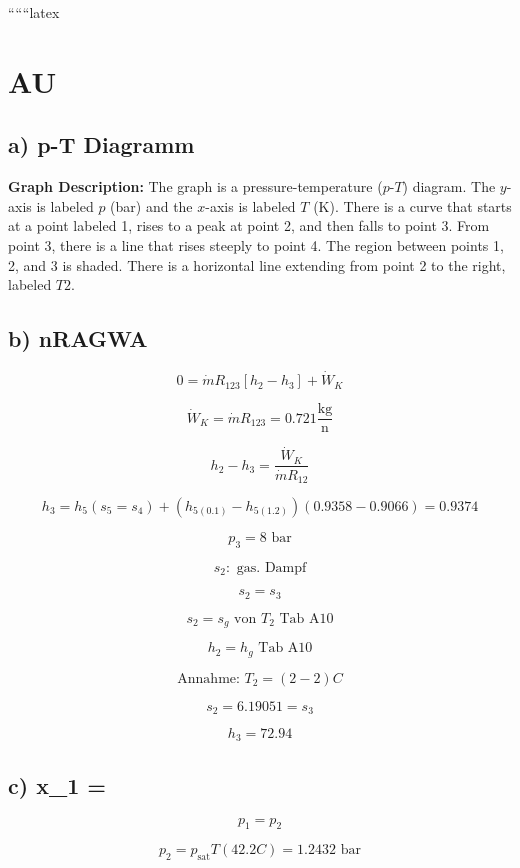 
``````latex


\section*{AU}

\subsection*{a) p-T Diagramm}

\textbf{Graph Description:} The graph is a pressure-temperature ($p$-$T$) diagram. The $y$-axis is labeled $p$ (bar) and the $x$-axis is labeled $T$ (K). There is a curve that starts at a point labeled 1, rises to a peak at point 2, and then falls to point 3. From point 3, there is a line that rises steeply to point 4. The region between points 1, 2, and 3 is shaded. There is a horizontal line extending from point 2 to the right, labeled $T2$.

\subsection*{b) nRAGWA}

\[
0 = \dot{m} R_{123} \left[ h_2 - h_3 \right] + \dot{W}_K
\]

\[
\dot{W}_K = \dot{m} R_{123} = 0.721 \frac{\text{kg}}{\text{n}}
\]

\[
h_2 - h_3 = \frac{\dot{W}_K}{\dot{m} R_{12}}
\]

\[
h_3 = h_5 (s_5 = s_4) + \left( h_{5(0.1)} - h_{5(1.2)} \right) \left( 0.9358 - 0.9066 \right) = 0.9374
\]

\[
p_3 = 8 \text{ bar}
\]

\[
s_2: \text{ gas. Dampf}
\]

\[
s_2 = s_3
\]

\[
s_2 = s_g \text{ von } T_2 \text{ Tab A10}
\]

\[
h_2 = h_g \text{ Tab A10}
\]

\[
\text{Annahme: } T_2 = (2-2) C
\]

\[
s_2 = 6.19051 = s_3
\]

\[
h_3 = 72.94
\]

\subsection*{c) x_1 = }

\[
p_1 = p_2
\]

\[
p_2 = p_{\text{sat}} T(42.2 C) = 1.2432 \text{ bar}
\]

